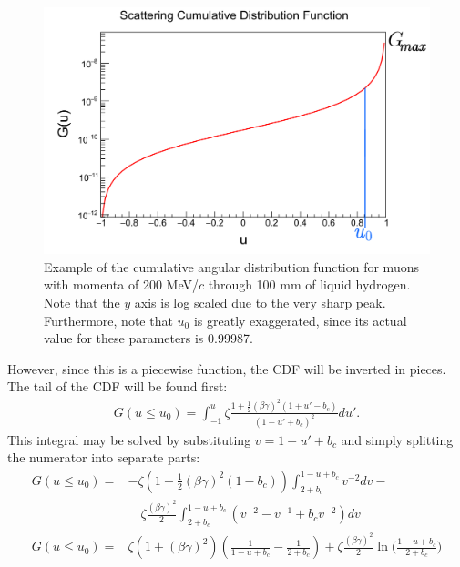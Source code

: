 \begin{figure}
  \centering
    \includegraphics[width=\textwidth]{Figures/scatdist_example} 
  \caption[Example of the COSY cumulative angular distribution function.]{Example of the cumulative angular distribution function for muons with momenta of 200 MeV/$c$ through 100 mm of liquid hydrogen. Note that the $y$ axis is log scaled due to the very sharp peak. Furthermore, note that $u_0$ is greatly exaggerated, since its actual value for these parameters is 0.99987.}
  \label{fig:scatdist_example}
\end{figure}

However, since this is a piecewise function, the CDF will be inverted in pieces. The tail of the CDF will be found first:
\begin{align*}
G(u\leq u_0)=\int _{-1} ^u \zeta \frac{1+\frac{1}{2}(\beta\gamma)^2 (1+u'-b_c)}{(1-u'+b_c)^2} du'.
\end{align*}
This integral may be solved by substituting $v=1-u'+b_c$ and simply splitting the numerator into separate parts:
\begin{align}
\nonumber
G(u\leq u_0)=&-\zeta(1+\frac{1}{2}(\beta\gamma)^2(1-b_c))\int_{2+b_c} ^{1-u+b_c} v^{-2} dv - \\
\nonumber
& \quad \zeta \frac{(\beta\gamma)^2}{2}\int_{2+b_c} ^{1-u+b_c} (v^{-2} - v^{-1} + b_c v^{-2}) dv\\
G(u\leq u_0)=&\zeta(1+(\beta\gamma)^2)\left(\frac{1}{1-u+b_c} - \frac{1}{2+b_c}\right)+\zeta \frac{(\beta\gamma)^2}{2} \ln\Big(\frac{1-u+b_c}{2+b_c}\Big) \label{eqn:cosyGTail}
\end{align}

